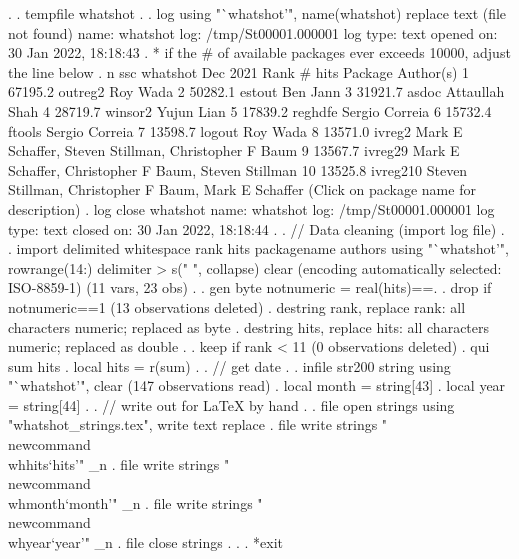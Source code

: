 . 
. tempfile whatshot
{\smallskip}
. 
. log using "`whatshot'", name(whatshot) replace text
(file{} not found)
      name:  whatshot
       log:  /tmp/St00001.000001
  log type:  text
 opened on:  30 Jan 2022, 18:18:43
{\smallskip}
. * if the \# of available packages ever exceeds 10000, adjust the line below
. n ssc whatshot
{\smallskip}
{}
{\smallskip}
        Dec 2021   
  Rank   \# hits    Package       Author(s)
     1  67195.2    outreg2       Roy Wada                                
     2  50282.1    estout        Ben Jann                                
     3  31921.7    asdoc         Attaullah Shah                          
     4  28719.7    winsor2       Yujun Lian                              
     5  17839.2    reghdfe       Sergio Correia                          
     6  15732.4    ftools        Sergio Correia                          
     7  13598.7    logout        Roy Wada                                
     8  13571.0    ivreg2        Mark E Schaffer, Steven Stillman,       
                                   Christopher F Baum                      
     9  13567.7    ivreg29       Mark E Schaffer, Christopher F Baum,    
                                   Steven Stillman                         
    10  13525.8    ivreg210      Steven Stillman, Christopher F Baum,    
                                   Mark E Schaffer                         
  (Click on package name for description)
{\smallskip}
. log close whatshot
      name:  whatshot
       log:  /tmp/St00001.000001
  log type:  text
 closed on:  30 Jan 2022, 18:18:44
{\smallskip}
. 
. // Data cleaning (import log file)
. 
. import delimited whitespace rank hits packagename authors using "`whatshot'", rowrange(14:) delimiter
> s("       ", collapse) clear
(encoding automatically selected: ISO-8859-1)
(11 vars, 23 obs)
{\smallskip}
. 
. gen byte notnumeric = real(hits)==.
{\smallskip}
. drop if notnumeric==1
(13 observations deleted)
{\smallskip}
. destring rank, replace
rank: all characters numeric; replaced as byte
{\smallskip}
. destring hits, replace
hits: all characters numeric; replaced as double
{\smallskip}
. 
. keep if rank < 11
(0 observations deleted)
{\smallskip}
. qui sum hits
{\smallskip}
. local hits = r(sum)
{\smallskip}
. 
. // get date
. 
. infile str200 string  using "`whatshot'",  clear
(147 observations read)
{\smallskip}
. local month = string[43]
{\smallskip}
. local year  = string[44]
{\smallskip}
. 
. // write out for LaTeX by hand
. 
. file open strings using "whatshot_strings.tex", write text replace
{\smallskip}
. file write strings  "\\newcommand{\lbr}\\whhits{\rbr}{\lbr}`hits'{\rbr}" _n
{\smallskip}
. file write strings  "\\newcommand{\lbr}\\whmonth{\rbr}{\lbr}`month'{\rbr}" _n
{\smallskip}
. file write strings  "\\newcommand{\lbr}\\whyear{\rbr}{\lbr}`year'{\rbr}" _n
{\smallskip}
. file close strings
{\smallskip}
. 
. 
. *exit
